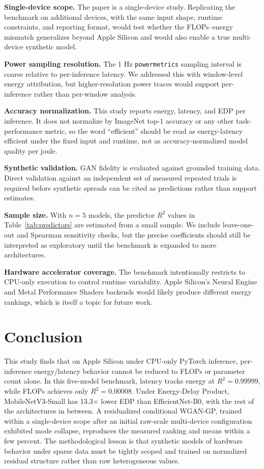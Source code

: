 \documentclass[conference]{IEEEtran}
\begin{document}
\textbf{Single-device scope.} The paper is a single-device study. Replicating
the benchmark on additional devices, with the same input shape, runtime
constraints, and reporting format, would test whether the FLOPs--energy
mismatch generalizes beyond Apple Silicon and would also enable a true
multi-device synthetic model.

\textbf{Power sampling resolution.} The 1 Hz \texttt{powermetrics} sampling
interval is coarse relative to per-inference latency. We addressed this with
window-level energy attribution, but higher-resolution power traces would
support per-inference rather than per-window analysis.

\textbf{Accuracy normalization.} This study reports energy, latency, and EDP
per inference. It does not normalize by ImageNet top-1 accuracy or any other
task-performance metric, so the word ``efficient'' should be read as
energy-latency efficient under the fixed input and runtime, not as
accuracy-normalized model quality per joule.

\textbf{Synthetic validation.} GAN fidelity is evaluated against grounded
training data. Direct validation against an independent set of measured
repeated trials is required before synthetic spreads can be cited as
predictions rather than support estimates.

\textbf{Sample size.} With $n = 5$ models, the predictor $R^2$ values in
Table~\ref{tab:predictors} are estimated from a small sample. We include
leave-one-out and Spearman sensitivity checks, but the precise coefficients
should still be interpreted as exploratory until the benchmark is expanded to
more architectures.

\textbf{Hardware accelerator coverage.} The benchmark intentionally restricts
to CPU-only execution to control runtime variability. Apple Silicon's Neural
Engine and Metal Performance Shaders backends would likely produce different
energy rankings, which is itself a topic for future work.

\section{Conclusion}
This study finds that on Apple Silicon under CPU-only PyTorch inference,
per-inference energy/latency behavior cannot be reduced to FLOPs or parameter
count alone.
In this five-model benchmark, latency tracks energy at $R^2 = 0.99999$,
while FLOPs achieves only $R^2 = 0.00008$. Under Energy-Delay Product,
MobileNetV3-Small has 13.3$\times$ lower EDP than EfficientNet-B0, with the
rest of the architectures in between. A residualized conditional WGAN-GP,
trained within a single-device
scope after an initial raw-scale multi-device configuration exhibited mode
collapse, reproduces the measured ranking and means within a few percent.
The methodological lesson is that synthetic models of hardware behavior
under sparse data must be tightly scoped and trained on normalized residual
structure rather than raw heterogeneous values.
\end{document}
